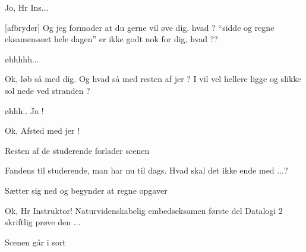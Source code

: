 \documentclass[a4paper,11pt]{article}
\begin{document}
\begin{sketch}
		Jo, Hr Ins...

[afbryder]
		Og jeg formoder at du gerne vil øve dig, hvad ?
		``sidde og regne eksamenssæt hele dagen'' er ikke godt
		nok for dig, hvad ??

		øhhhhh...

 	Ok, løb så med dig. 
		Og hvad så med resten af jer ? I vil vel hellere
		ligge og slikke sol nede ved stranden ?

		øhhh.. Ja !

 	Ok, Afsted med jer !

\scene
Resten af de studerende forlader scenen

 	Fandens til studerende, man har nu til dags. Hvad skal
		det ikke ende med ...?

\scene
Sætter sig ned og begynder at regne opgaver

 	Ok, Hr Instruktor! Naturvidenskabelig embedseksamen
		første del Datalogi 2 skriftlig prøve den ...

\scene
Scenen går i sort

\end{sketch}
\end{document}
